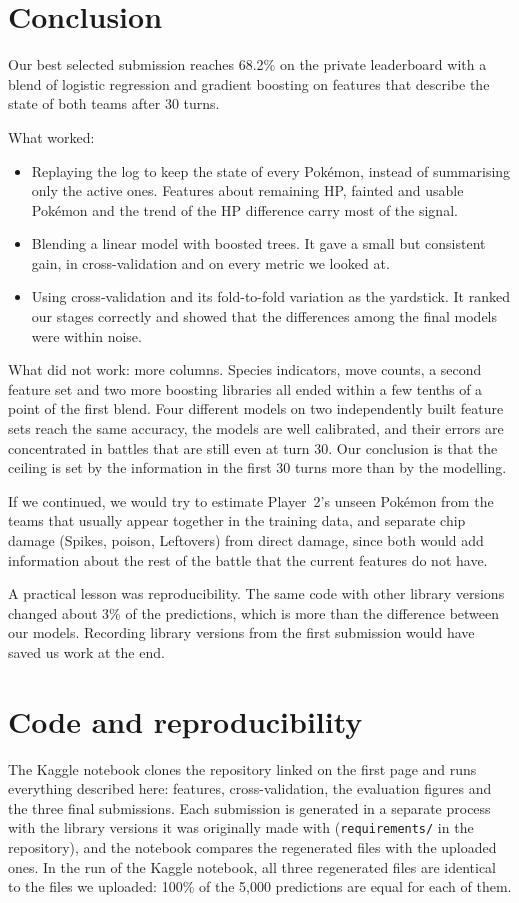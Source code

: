 \documentclass[11pt,a4paper]{article}
\begin{document}
\section{Conclusion}

Our best selected submission reaches 68.2\% on the private leaderboard with a blend of logistic
regression and gradient boosting on features that describe the state of both teams after 30 turns.

What worked:
\begin{itemize}
\item Replaying the log to keep the state of every Pokémon, instead of summarising only the active
ones. Features about remaining HP, fainted and usable Pokémon and the trend of the HP difference
carry most of the signal.
\item Blending a linear model with boosted trees. It gave a small but consistent gain, in
cross-validation and on every metric we looked at.
\item Using cross-validation and its fold-to-fold variation as the yardstick. It ranked our stages
correctly and showed that the differences among the final models were within noise.
\end{itemize}

What did not work: more columns. Species indicators, move counts, a second feature set and two more
boosting libraries all ended within a few tenths of a point of the first blend. Four different
models on two independently built feature sets reach the same accuracy, the models are well
calibrated, and their errors are concentrated in battles that are still even at turn 30. Our
conclusion is that the ceiling is set by the information in the first 30 turns more than by the
modelling.

If we continued, we would try to estimate Player~2's unseen Pokémon from the teams that usually
appear together in the training data, and separate chip damage (Spikes, poison, Leftovers) from
direct damage, since both would add information about the rest of the battle that the current
features do not have.

A practical lesson was reproducibility. The same code with other library versions changed
about 3\% of the predictions, which is more than the difference between our models. Recording
library versions from the first submission would have saved us work at the end.

\section*{Code and reproducibility}

The Kaggle notebook clones the repository linked on the first page and runs everything described
here: features, cross-validation, the evaluation figures and the three final submissions. Each
submission is generated in a separate process with the library versions it was originally made
with (\texttt{requirements/} in the repository), and the notebook compares the regenerated files
with the uploaded ones. In the run of the Kaggle notebook, all three regenerated files are
identical to the files we uploaded: 100\% of the 5,000 predictions are equal for each of them.
\end{document}
